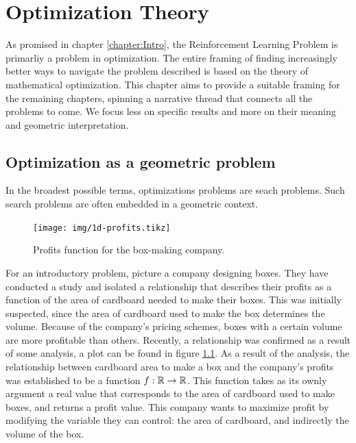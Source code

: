 \chapter{Optimization Theory}
\label{chapter:OptimizationTheory}

As promised in chapter \ref{chapter:Intro}, the Reinforcement Learning Problem
is primarliy a problem in optimization. The entire framing of finding
increasingly better ways to navigate the problem described is based on the theory
of mathematical optimization. This chapter aims to provide a suitable framing
for the remaining chapters, spinning a narrative thread that connects all the
problems to come. We focus less on specific results and more on their meaning
and geometric interpretation.

\section{Optimization as a geometric problem}

In the broadest possible terms, optimizations problems are seach problems. Such
search problems are often embedded in a geometric context.

\begin{figure}
   \centering
   \texttt{[image: img/1d-profits.tikz]} 
   \caption{Profits function for the box-making company.}
   \label{fig:1d-profits}
\end{figure}

For an introductory problem, picture a company designing boxes. They have
conducted a study and isolated a relationship that describes their profits as a
function of the area of cardboard needed to make their boxes. This was initially
suspected, since the area of cardboard used to make the box determines the
volume.  Because of the company's pricing schemes, boxes with a certain volume
are more profitable than others. Recently, a relationship was confirmed as a
result of some analysis, a plot can be found in figure \ref{fig:1d-profits}. As
a result of the analysis, the relationship between cardboard area to make a box
and the company's profits was established to be a function $f: \mathbb{R} \to \mathbb{R}$. This
function takes as its ownly argument a real value that corresponds to the area
of cardboard used to make boxes, and returns a profit value. This company wants
to maximize profit by modifying the variable they can control: the area of
cardboard, and indirectly the volume of the box.

